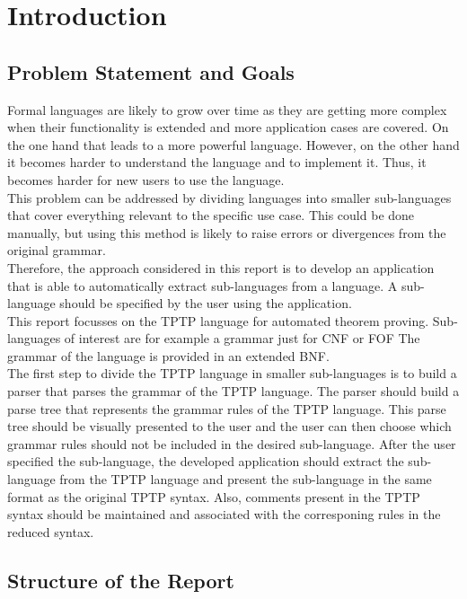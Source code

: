 
\chapter{Introduction}\label{cha:Introduction}

\section{Problem Statement and Goals}\label{sec:Aufgabenstellung}
Formal languages are likely to grow over time as they are getting more complex when their functionality is extended and more application cases are covered.
On the one hand that leads to a more powerful language.
However, on the other hand it becomes harder to understand the language and to implement it.
Thus, it becomes harder for new users to use the language.\\
This problem can be addressed by dividing languages into smaller sub-languages that cover everything relevant to the specific use case. 
This could be done manually, but using this method is likely to raise errors or divergences from the original grammar.\\
Therefore, the approach considered in this report is to develop an application that is able to automatically extract sub-languages from a language.
A sub-language should be specified by the user using the application.\\
This report focusses on the \acf{TPTP} language for automated theorem proving.
Sub-languages of interest are for example a grammar just for \ac{CNF} or \ac{FOF}
The grammar of the language is provided in an extended \acf{BNF}.\\
The first step to divide the \ac{TPTP} language in smaller sub-languages is to build a parser that parses the grammar of the \ac{TPTP} language.
The parser should build a parse tree that represents the grammar rules of the \ac{TPTP} language.
This parse tree should be visually presented to the user and the user can then choose which grammar rules should not be included in the desired sub-language.
After the user specified the sub-language, the developed application should extract the sub-language from the \ac{TPTP} language and present the sub-language in the same format as the original \ac{TPTP} syntax.
Also, comments present in the \ac{TPTP} syntax should be maintained and associated with the corresponing rules in the reduced syntax.
\section{Structure of the Report}\label{sec:Structure}
